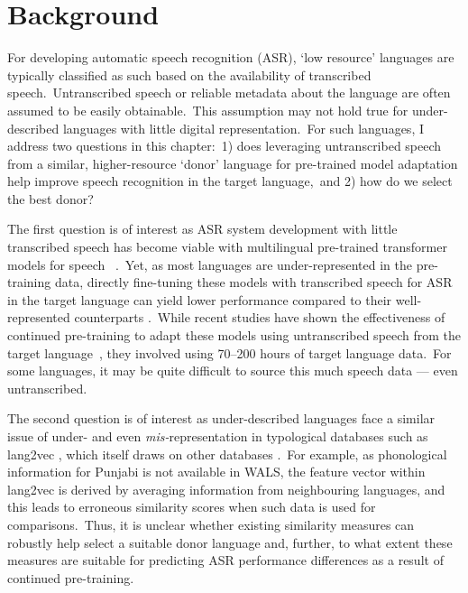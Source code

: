 \documentclass[main.tex]{subfiles}
\begin{document}
\section{Background}
\label{sec:sigtyp:bg}

For developing automatic speech recognition (ASR), `low resource' languages are typically classified as such based on the availability of transcribed speech.~Untranscribed speech or reliable metadata about the language are often assumed to be easily obtainable.~This assumption may not hold true for under-described languages with little digital representation.~For such languages, I address two questions in this chapter:~1) does leveraging untranscribed speech from a similar, higher-resource `donor' language for pre-trained model adaptation help improve speech recognition in the target language,~and 2) how do we select the best donor?

The first question is of interest as ASR system development with little transcribed speech has become viable with multilingual pre-trained transformer models for speech ~\parencite[e.g.~wav2vec 2.0 XLSR-128:][]{babu22_interspeech}.~Yet, as most languages are under-represented in the pre-training data, directly fine-tuning these models with transcribed speech for ASR in the target language can yield lower performance compared to their well-represented counterparts \parencite{conneau2023fleurs}.~While recent studies have shown the effectiveness of continued pre-training to adapt these models using untranscribed speech from the target language~\parencite{NOWAKOWSKI2023103148,paraskevopoulos2024sample}, they involved using 70--200 hours of target language data.~For some languages, it may be quite difficult to source this much speech data --- even untranscribed.

The second question is of interest as under-described languages face a similar issue of under- and even \emph{mis-}representation in typological databases such as lang2vec \parencite{littell2017uriel}, which itself draws on other databases \parencite[e.g.~phonological information from WALS:][]{haspelmath2009typological}.~For example, as phonological information for Punjabi is not available in WALS, the feature vector within lang2vec is derived by averaging information from neighbouring languages, and this leads to erroneous similarity scores when such data is used for comparisons.~Thus, it is unclear whether existing similarity measures can robustly help select a suitable donor language and, further, to what extent these measures are suitable for predicting ASR performance differences as a result of continued pre-training.
\end{document}
